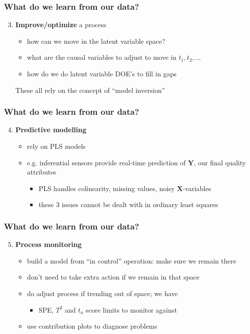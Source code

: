 \documentclass[handout, 12pt]{beamer}
\begin{document}
\begin{frame}\frametitle{What do we learn from our data?}

\begin{enumerate}
	\setcounter{enumi}{2}
	\item {\bf \color{myGreen}Improve/optimize} a process
	\begin{itemize}
		\item 	how can we move in the latent variable space?
		\item 	what are the causal variables to adjust to move in \( t_1, t_2, \ldots \)
		\item 	how do we do latent variable DOE's to fill in gaps
	\end{itemize}	
	These all rely on the concept of \alert{``model inversion''}
\end{enumerate}
\end{frame}

\begin{frame}\frametitle{What do we learn from our data?}

\begin{enumerate}
	\setcounter{enumi}{3}
	\item {\bf \color{myGreen}Predictive modelling} 
	\begin{itemize}
		\item 	rely on PLS models
		\item 	e.g. inferential sensors provide real-time prediction of \( \mathbf{Y} \), our final quality attributes
		\begin{itemize}
			\item 	PLS handles colinearity, missing values, noisy \( \mathbf{X} \)-variables
			\item 	these 3 issues cannot be dealt with in ordinary least squares
		\end{itemize}
	\end{itemize}	
\end{enumerate}
\end{frame}

\begin{frame}\frametitle{What do we learn from our data?}

\begin{enumerate}
	\setcounter{enumi}{4}
	\item {\bf \color{myGreen}Process monitoring} 
	\begin{itemize}
		\item 	build a model from ``in control'' operation: make sure we remain there
		\item 	don't need to take extra action if we remain in that space
		\item 	do adjust process if trending out of space; we have
		\begin{itemize}
			\item 	SPE, \( T^2 \) and \( t_a \) score limits to monitor against
		\end{itemize}
		
		\item 	use contribution plots to diagnose problems
	\end{itemize}	
\end{enumerate}
\end{frame}
\end{document}
